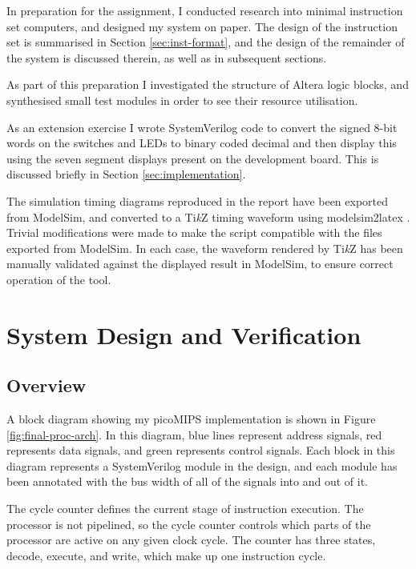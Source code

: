 In preparation for the assignment, I conducted research into minimal instruction set computers, and designed my system on paper. The design of the instruction set is summarised in Section \ref{sec:inst-format}, and the design of the remainder of the system is discussed therein, as well as in subsequent sections.

As part of this preparation I investigated the structure of Altera logic blocks, and synthesised small test modules in order to see their resource utilisation.

As an extension exercise I wrote SystemVerilog code to convert the signed 8-bit words on the switches and LEDs to binary coded decimal and then display this using the seven segment displays present on the development board. This is discussed briefly in Section \ref{sec:implementation}.

The simulation timing diagrams reproduced in the report have been exported from ModelSim, and converted to a Ti\textit{k}Z timing waveform using modelsim2latex \cite{show2016}. Trivial modifications were made to make the script compatible with the files exported from ModelSim. In each case, the waveform rendered by Ti\textit{k}Z has been manually validated against the displayed result in ModelSim, to ensure correct operation of the tool.


\section{System Design and Verification} \label{sec:design-verif}

\subsection{Overview} \label{sec:sys-overview}

A block diagram showing my picoMIPS implementation is shown in Figure \ref{fig:final-proc-arch}. In this diagram, blue lines represent address signals, red represents data signals, and green represents control signals. Each block in this diagram represents a SystemVerilog module in the design, and each module has been annotated with the bus width of all of the signals into and out of it.

The cycle counter defines the current stage of instruction execution. The processor is not pipelined, so the cycle counter controls which parts of the processor are active on any given clock cycle. The counter has three states, decode, execute, and write, which make up one instruction cycle.

